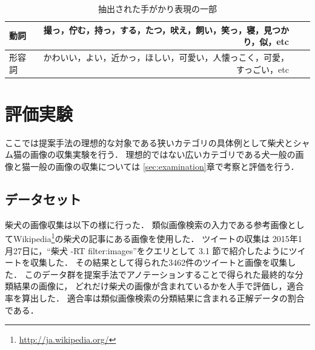 
\begin{table}[bt]
\begin{center}
\caption{抽出された手がかり表現の一部}
\label{tab:predicate}
\begin{tabular}{|l|r|r|r|}\hline
動詞& 撮っ，佇む，持っ，する，たつ，吠え，飼い，笑っ，寝，見つかり，似，etc \\ \hline
形容詞& かわいい，よい，近かっ，ほしい，可愛い，人懐っこく，可愛，すっごい，etc \\ \hline
\end{tabular}
\end{center}
\end{table}



\chapter{評価実験}
\label{sec:experiment}

ここでは提案手法の理想的な対象である狭いカテゴリの具体例として柴犬とシャム猫の画像の収集実験を行う．
理想的ではない広いカテゴリである犬一般の画像と猫一般の画像の収集については
\ref{sec:examination}章で考察と評価を行う．

\section{データセット}


柴犬の画像収集は以下の様に行った．
類似画像検索の入力である参考画像としてWikipedia\footnote{\url{http://ja.wikipedia.org/}}の柴犬の記事にある画像を使用した．
ツイートの収集は
2015年1月27日に，``柴犬 -RT filter:images''をクエリとして
3.1
節で紹介したようにツイートを収集した．
その結果として得られた3462件のツイートと画像を収集した．
このデータ群を提案手法でアノテーションすることで得られた最終的な分類結果の画像に，
どれだけ柴犬の画像が含まれているかを人手で評価し，適合率を算出した．
適合率は類似画像検索の分類結果に含まれる正解データの割合である．

